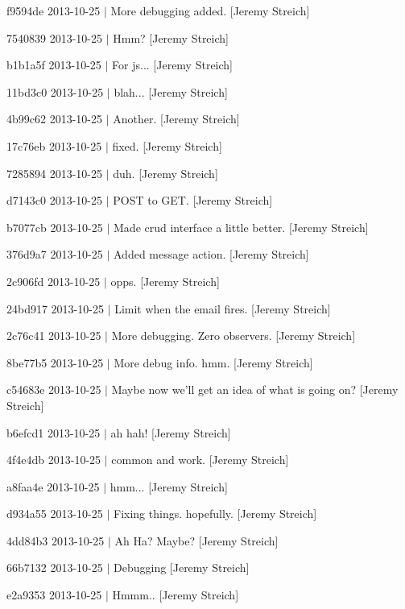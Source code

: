 \begin{DoxyItemize}
\item f9594de 2013-\/10-\/25 $|$ More debugging added. \mbox{[}Jeremy Streich\mbox{]}
\item 7540839 2013-\/10-\/25 $|$ Hmm? \mbox{[}Jeremy Streich\mbox{]}
\item b1b1a5f 2013-\/10-\/25 $|$ For js... \mbox{[}Jeremy Streich\mbox{]}
\item 11bd3c0 2013-\/10-\/25 $|$ blah... \mbox{[}Jeremy Streich\mbox{]}
\item 4b99c62 2013-\/10-\/25 $|$ Another. \mbox{[}Jeremy Streich\mbox{]}
\item 17c76eb 2013-\/10-\/25 $|$ fixed. \mbox{[}Jeremy Streich\mbox{]}
\item 7285894 2013-\/10-\/25 $|$ duh. \mbox{[}Jeremy Streich\mbox{]}
\item d7143c0 2013-\/10-\/25 $|$ P\-O\-S\-T to G\-E\-T. \mbox{[}Jeremy Streich\mbox{]}
\item b7077cb 2013-\/10-\/25 $|$ Made crud interface a little better. \mbox{[}Jeremy Streich\mbox{]}
\item 376d9a7 2013-\/10-\/25 $|$ Added message action. \mbox{[}Jeremy Streich\mbox{]}
\item 2c906fd 2013-\/10-\/25 $|$ opps. \mbox{[}Jeremy Streich\mbox{]}
\item 24bd917 2013-\/10-\/25 $|$ Limit when the email fires. \mbox{[}Jeremy Streich\mbox{]}
\item 2c76c41 2013-\/10-\/25 $|$ More debugging. Zero observers. \mbox{[}Jeremy Streich\mbox{]}
\item 8be77b5 2013-\/10-\/25 $|$ More debug info. hmm. \mbox{[}Jeremy Streich\mbox{]}
\item c54683e 2013-\/10-\/25 $|$ Maybe now we'll get an idea of what is going on? \mbox{[}Jeremy Streich\mbox{]}
\item b6efcd1 2013-\/10-\/25 $|$ ah hah! \mbox{[}Jeremy Streich\mbox{]}
\item 4f4e4db 2013-\/10-\/25 $|$ common and work. \mbox{[}Jeremy Streich\mbox{]}
\item a8faa4e 2013-\/10-\/25 $|$ hmm... \mbox{[}Jeremy Streich\mbox{]}
\item d934a55 2013-\/10-\/25 $|$ Fixing things. hopefully. \mbox{[}Jeremy Streich\mbox{]}
\item 4dd84b3 2013-\/10-\/25 $|$ Ah Ha? Maybe? \mbox{[}Jeremy Streich\mbox{]}
\item 66b7132 2013-\/10-\/25 $|$ Debugging \mbox{[}Jeremy Streich\mbox{]}
\item e2a9353 2013-\/10-\/25 $|$ Hmmm.. \mbox{[}Jeremy Streich\mbox{]}

\end{DoxyItemize}
